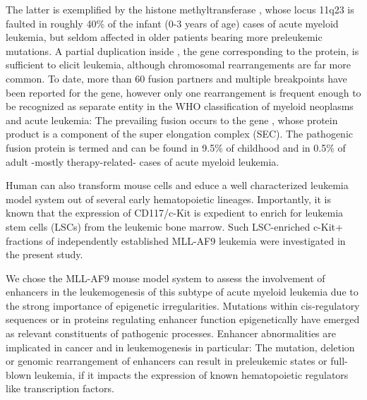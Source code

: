 The latter is exemplified by the histone methyltransferase  \cite{Ziemin-vanderPoel1991,Thirman1993}, whose locus 11q23 is faulted in roughly 40\% of the infant (0-3 years of age) cases of acute myeloid leukemia, but seldom affected in older patients bearing more preleukemic mutations\cite{Bolouri2017}. A partial duplication inside , the gene corresponding to the  protein, is sufficient to elicit leukemia\cite{Basecke2006}, although chromosomal rearrangements are far more common\cite{Li2014a}. To date, more than 60 fusion partners\cite{VanderBurg1999,Slany2016} and multiple breakpoints\cite{Kobayashi1993} have been reported for the  gene, however only one rearrangement is frequent enough to be recognized as separate entity in the WHO classification of
myeloid neoplasms and acute leukemia\cite{Arber2016}: The prevailing fusion occurs to the  gene \cite{Rowley1973}, whose protein product  is a component of the super elongation complex (SEC)\cite{He2010,Lin2010}. The pathogenic fusion protein is termed  and can be found in 9.5\% of childhood and in 0.5\% of adult -mostly therapy-related\cite{Super1993}- cases of acute myeloid leukemia\cite{Balgobind2009}.

Human  can also transform mouse cells and educe a well characterized leukemia model system\cite{Somervaille2009,Krivtsov2013,Stavropoulou2016} out of several early hematopoietic lineages\cite{George2016}. Importantly, it is known that the expression of CD117/c-Kit is expedient to enrich for leukemia stem cells (LSCs)\cite{Dick2005} from the leukemic bone marrow\cite{Krivtsov2006,Somervaille2006}. Such LSC-enriched c-Kit+ fractions of independently established MLL-AF9 leukemia were investigated in the present study. 

We chose the MLL-AF9 mouse model system to assess the involvement of enhancers in the leukemogenesis of this subtype of acute myeloid leukemia due to the strong importance of epigenetic irregularities. Mutations within cis-regulatory sequences or in proteins regulating enhancer function epigenetically have emerged as relevant constituents of pathogenic processes\cite{Smith2014}. Enhancer abnormalities are implicated in cancer\cite{Sur2016} and in leukemogenesis in particular\cite{Corces2016}: The mutation\cite{Mansour2014}, deletion\cite{Will2015} or genomic rearrangement\cite{Yamazaki2014,Groeschel2014} of enhancers can result in preleukemic states or full-blown leukemia, if it impacts the expression of known hematopoietic regulators like transcription factors. 

